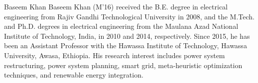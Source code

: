 \documentclass[10pt,journal,compsoc]{IEEEtran}
\begin{document}
\begin{IEEEbiography}{Baseem Khan}
	Baseem Khan (M’16) received the B.E. degree in electrical engineering from Rajiv Gandhi Technological University in 2008, and the M.Tech. and Ph.D. degrees in electrical engineering from the Maulana Azad National Institute of Technology, India, in 2010 and 2014, respectively. Since 2015, he has been an Assistant Professor with the Hawassa Institute of Technology, Hawassa University, Awasa, Ethiopia. His research interest includes power system restructuring, power system planning, smart grid, meta-heuristic optimization techniques, and renewable energy integration.
\end{IEEEbiography}


	
\end{document}
